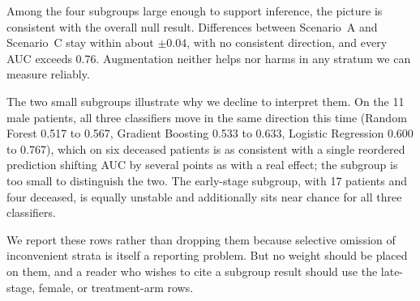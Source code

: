 \documentclass[journal,onecolumn]{IEEEtran}
\begin{document}
\begin{table}[!t]
  \centering
  \caption{Subgroup Test-Set AUC, N\_Days Excluded, Reported as Scenario A / Scenario C. Subgroups Below $n = 20$ Are Reported for Completeness Only}
  \label{tab:subgroup}
\end{table}

Among the four subgroups large enough to support inference, the picture is consistent with the overall null result. Differences between Scenario~A and Scenario~C stay within about $\pm 0.04$, with no consistent direction, and every AUC exceeds 0.76. Augmentation neither helps nor harms in any stratum we can measure reliably.

The two small subgroups illustrate why we decline to interpret them. On the 11 male patients, all three classifiers move in the same direction this time (Random Forest 0.517 to 0.567, Gradient Boosting 0.533 to 0.633, Logistic Regression 0.600 to 0.767), which on six deceased patients is as consistent with a single reordered prediction shifting AUC by several points as with a real effect; the subgroup is too small to distinguish the two. The early-stage subgroup, with 17 patients and four deceased, is equally unstable and additionally sits near chance for all three classifiers.

We report these rows rather than dropping them because selective omission of inconvenient strata is itself a reporting problem. But no weight should be placed on them, and a reader who wishes to cite a subgroup result should use the late-stage, female, or treatment-arm rows.
\end{document}
